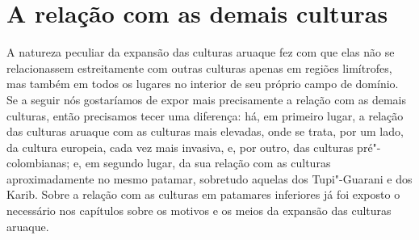 \chapter*{A relação com as demais culturas\smallskip{}}

A natureza peculiar da expansão das culturas aruaque fez com que elas
não se relacionassem estreitamente com outras culturas apenas em regiões
limítrofes, mas também em todos os lugares no interior de seu próprio
campo de domínio. Se a seguir nós gostaríamos de expor mais
precisamente a relação com as demais culturas, então precisamos tecer
uma diferença: há, em primeiro lugar, a relação das culturas aruaque com
as culturas mais elevadas, onde se trata, por um lado, da cultura
europeia, cada vez mais invasiva, e, por outro, das culturas
pré"-colombianas; e, em segundo lugar, da sua relação com as culturas
aproximadamente no mesmo patamar, sobretudo aquelas dos Tupi"-Guarani e
dos Karib. Sobre a relação com as culturas em patamares inferiores já
foi exposto o necessário nos capítulos sobre os motivos e os meios da
expansão das culturas aruaque.

